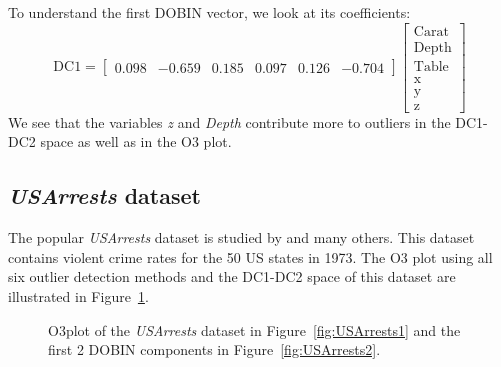 \documentclass[letter,12pt]{article}
\begin{document}
To understand the first DOBIN vector, we look at its coefficients:
\begin{equation}\label{eq:ResWithVis2}
	\text{DC1} = \begin{bmatrix}
		0.098 & -0.659 & 0.185 & 0.097 & 0.126 & -0.704
	\end{bmatrix}
	\begin{bmatrix}
		\text{Carat} \\
		\text{Depth} \\
		\text{Table} \\
		\text{x}     \\
		\text{y}     \\
		\text{z}
	\end{bmatrix}
\end{equation}
We see that the variables \textit{z} and \textit{Depth} contribute more to outliers in the DC1-DC2 space as well as in the O3 plot.

\subsection{\textit{USArrests} dataset}\label{sec:ResWithVis3}

The popular \textit{USArrests} dataset is studied by \cite{bailey1995interactive, sarkar2008labels, yaminiviolent} and many others. This dataset contains violent crime rates for the 50 US states in 1973. The O3 plot using all six outlier detection methods and the DC1-DC2 space of this dataset are illustrated in Figure~\ref{fig:USArrests}.

\begin{figure}[!ht]
	\centering
	\hfill
	\caption{O3plot of the \textit{USArrests} dataset in Figure~\ref{fig:USArrests1} and the first 2 DOBIN components in Figure~\ref{fig:USArrests2}.}
	\label{fig:USArrests}
\end{figure}
\end{document}
